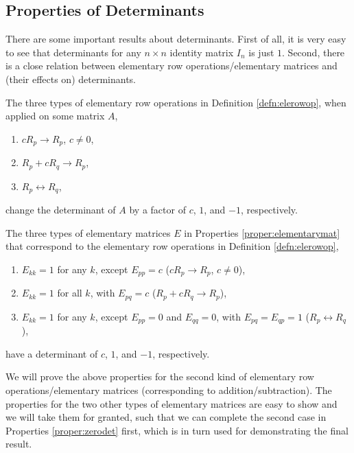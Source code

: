 \subsection{Properties of Determinants} There are some important results about determinants. First of all, it is very easy to see that determinants for any $n \times n$ identity matrix $I_n$ is just $1$. Second, there is a close relation between elementary row operations/elementary matrices and (their effects on) determinants.
\begin{proper}
\label{proper:elementaryopdet}
The three types of elementary row operations in Definition \ref{defn:elerowop}, when applied on some matrix $A$,
\begin{enumerate}
\item $cR_{p} \to R_{p}$, $c \neq 0$,
\item $R_{p} + cR_{q} \to R_{p}$,
\item $R_{p} \leftrightarrow R_{q}$,
\end{enumerate}
change the determinant of $A$ by a factor of $c$, $1$, and $-1$, respectively.
\end{proper}
\begin{proper}
\label{proper:elementarymatdet}
The three types of elementary matrices $E$ in Properties \ref{proper:elementarymat} that correspond to the elementary row operations in Definition \ref{defn:elerowop},
\begin{enumerate}
\item $E_{kk} = 1$ for any $k$, except $E_{pp} = c$ ($cR_{p} \to R_{p}$, $c \neq 0$),
\item $E_{kk} = 1$ for all $k$, with $E_{pq} = c$ ($R_{p} + cR_{q} \to R_{p}$),
\item $E_{kk} = 1$ for any $k$, except $E_{pp} = 0$ and $E_{qq} = 0$, with $E_{pq} = E_{qp} = 1$ ($R_{p} \leftrightarrow R_{q}$),
\end{enumerate}
have a determinant of $c$, $1$, and $-1$, respectively.
\end{proper}
We will prove the above properties for the second kind of elementary row operations/elementary matrices (corresponding to addition/subtraction). The properties for the two other types of elementary matrices are easy to show and we will take them for granted, such that we can complete the second case in Properties \ref{proper:zerodet} first, which is in turn used for demonstrating the final result.
